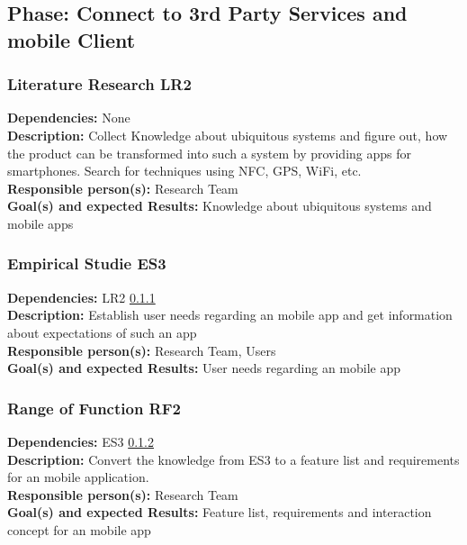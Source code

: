 \documentclass[a4paper,11pt]{article}
\begin{document}
\subsection{Phase: Connect to 3rd Party Services and mobile Client}
\label{sect:workplan:3rdpartiesandmobileclient}

\subsubsection{Literature Research LR2}
\label{sect:workplan:phase3:lr2}
\textbf{Dependencies:} None\\
\textbf{Description:} Collect Knowledge about ubiquitous systems and figure out, how the product can be transformed into such a system by providing apps for smartphones. Search for techniques using NFC, GPS, WiFi, etc.\\
\textbf{Responsible person(s):} Research Team\\
\textbf{Goal(s) and expected Results:} Knowledge about ubiquitous systems and mobile apps\\

\subsubsection{Empirical Studie ES3}
\label{sect:workplan:phase3:es3}
\textbf{Dependencies:} LR2 \ref{sect:workplan:phase3:lr2}\\
\textbf{Description:} Establish user needs regarding an mobile app and get information about expectations of such an app \\
\textbf{Responsible person(s):} Research Team, Users\\
\textbf{Goal(s) and expected Results:} User needs regarding an mobile app\\

\subsubsection{Range of Function RF2}
\label{sect:workplan:phase3:rf2}
\textbf{Dependencies:} ES3 \ref{sect:workplan:phase3:es3}\\
\textbf{Description:} Convert the knowledge from ES3 to a feature list and requirements for an mobile application.\\
\textbf{Responsible person(s):} Research Team\\
\textbf{Goal(s) and expected Results:} Feature list, requirements and interaction concept for an mobile app\\
\end{document}
